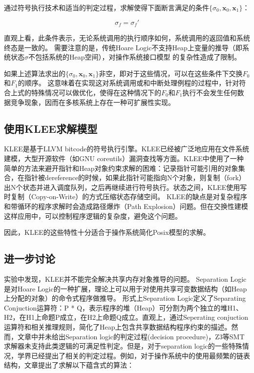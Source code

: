 通过符号执行技术和适当的判定过程，求解使得下面断言满足的条件$\{\sigma_0,\boldsymbol{x}_0,
\boldsymbol{x}_1\}$：

\begin{equation}
\label{eq:hoare4}
\sigma_f = \sigma_f'
\end{equation}

直观上看，此条件表示，无论系统调用的执行顺序如何，系统调用的返回值和系统终态是一致的。
需要注意的是，传统Hoare
Logic不支持Heap上变量的推导（即系统状态$\sigma$不包括系统的Heap空间），对操作系统接口模型
的复杂性造成了限制。

如果上述算法求出的$\{\sigma_0,\boldsymbol{x}_0,
\boldsymbol{x}_1\}$非空，即对于这些情况，可以在这些条件下交换$F_0$和$F_1$的顺序。
这意味着在实现这对系统调用或和中断处理例程的过程中，针对符合上式的特殊情况可以做优化，使得在这种情况下的$F_0$和$F_1$执行不会发生任何数据竞争现象，因而在多核系统上存在一种可扩展性实现。



\subsection{使用KLEE求解模型}
KLEE是基于LLVM
bitcode的符号执行引擎。KLEE已经被广泛地应用在文件系统建模，大型开源软件（如GNU
coreutils）漏洞查找\cite{Cadar:2008:KUA:1855741.1855756}等方面。KLEE中使用了一种简单的方法来避开指针和Heap对象约束求解的困难：记录指针可能引用的对象集合，在指针被dereference的时候，如果此指针可能指向N个对象，则复制（fork）出N个状态并进入调度队列，之后再继续进行符号执行。状态之间，KLEE使用写时复制（Copy-on-Write）的方式压缩状态存储空间。
KLEE的缺点是对复杂程序和带循环的程序求解时会造成路径爆炸（Path
Explosion）问题。但在交换性建模这样应用中，可以控制程序逻辑的复杂度，避免这个问题。

因此，KLEE的这些特性十分适合于操作系统简化Posix模型的求解。


\subsection{进一步讨论}

实验中发现，KLEE并不能完全解决共享内存对象推导的问题。
Separation Logic是对Hoare
Logic的一种扩展，理论上可以用于对使用共享可变数据结构（如Heap上分配的对象）的命令式程序做推导\cite{Reynolds:2002:SLL:645683.664578}。
形式上Separation Logic定义了Separating Conjuction运算符：P *
Q，表示程序的堆（Heap）可分割为两个独立的堆H1、H2，在H1上命题P成立，在H2上命题Q成立。直观上，通过Seperating
conjuction运算符和相关推理规则，简化了Heap上包含共享数据结构程序约束的描述。然而，文章\cite{Reynolds:2002:SLL:645683.664578}中并未给出Separation
logic的判定过程(decision
procedure)，Z3等SMT求解器未支持此类逻辑的可满足性判定。但是，对于separation
logic的一些特殊情况，学界已经提出了相关的判定过程。例如，对于操作系统中的使用最频繁的链表结构，文章\cite{seplogic:theorem}提出了求解以下蕴含式的算法：


